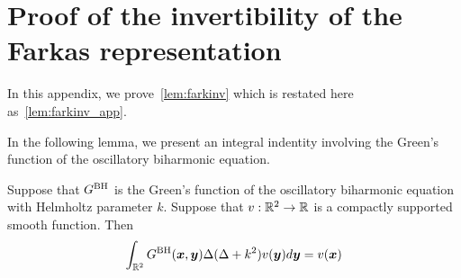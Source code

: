 
\appendix

\section{Proof of the invertibility of the Farkas representation}
In this appendix, we prove~\cref{lem:farkinv} which is restated here
as~\cref{lem:farkinv_app}.

In the following lemma, we present an integral indentity involving the
Green's function of the oscillatory biharmonic equation.
\begin{lem}
Suppose that $G^{\textrm{BH}}$ is the Green's function of the oscillatory biharmonic equation 
with Helmholtz parameter $k$. Suppose that $v:\mathbb{R}^{2} \to \mathbb{R}$ is a compactly supported smooth
function. Then
\begin{equation}
\int_{\mathbb{R}^{2}} G^{\textrm{BH}}({\boldsymbol x},{\boldsymbol y}) \Delta (\Delta + k^2) v({\boldsymbol y}) d{\boldsymbol y} = v({\boldsymbol x})
\end{equation}
\end{lem}
